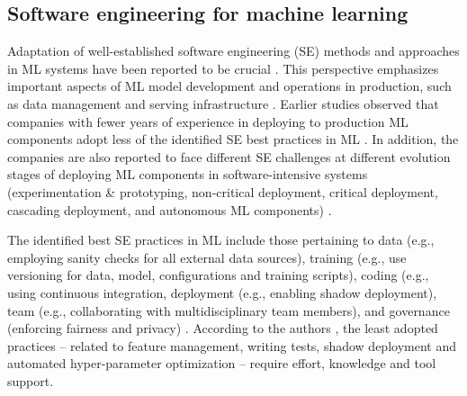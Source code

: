 
\subsection{Software engineering for machine learning}
Adaptation of well-established software engineering (SE) methods and approaches in ML systems have been reported to be crucial \cite{Amershi2019}. This perspective emphasizes important aspects of ML model development and operations in production, such as data management and serving infrastructure \cite{Sculley2015}. Earlier studies observed that companies with fewer years of experience in deploying to production ML components adopt less of the identified SE best practices in ML \cite{Serban2020Practices}. In addition, the companies are also reported to face different SE challenges at different evolution stages of deploying ML components in software-intensive systems (experimentation \& prototyping, non-critical deployment, critical deployment, cascading deployment, and autonomous ML components) \cite{Lwakatare2019}.


The identified best SE practices in ML include those pertaining to data (e.g., employing sanity checks for all external data sources), training (e.g., use versioning for data, model, configurations and training scripts), coding (e.g., using continuous integration, deployment (e.g., enabling shadow deployment), team (e.g., collaborating with multidisciplinary team members), and governance (enforcing fairness and privacy) \cite{Serban2020Practices}. According to the authors \cite{Serban2020Practices}, the least adopted practices --  related to feature management, writing tests, shadow deployment and automated hyper-parameter optimization -- require effort, knowledge and tool support. 


